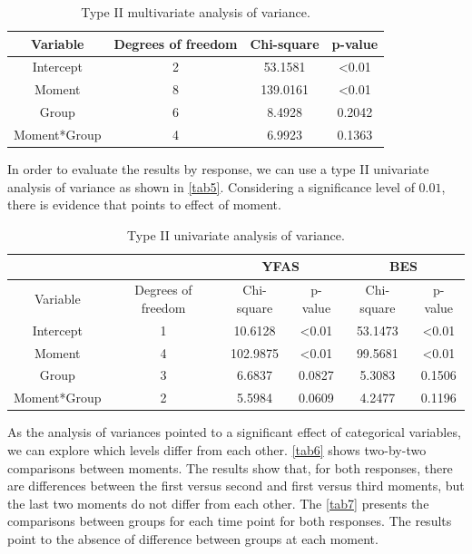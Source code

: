 \documentclass[USenglish]{article}
\theoremstyle{dgthm}
\theoremstyle{dgdef}
\begin{document}
\begin{table}[H]
\centering
\begin{tabular}{cccc}
\hline
Variable      & Degrees of freedom & Chi-square   & p-value        \\ \hline
Intercept     & 2                  & 53.1581      & \textless 0.01 \\
Moment        & 8                  & 139.0161     & \textless 0.01 \\
Group         & 6                  & 8.4928       & 0.2042         \\
Moment*Group  & 4                  & 6.9923       & 0.1363         \\ \hline
\end{tabular}
\caption{Type II multivariate analysis of variance.}
\label{tab4}
\end{table}

In order to evaluate the results by response, we can use a type II univariate analysis of variance as shown in \autoref{tab5}. Considering a significance level of $0.01$, there is evidence that points to effect of moment.

\begin{table}[H]
\centering
\begin{tabular}{c|c|cc|cc}
\hline
              &                    & \multicolumn{2}{c|}{YFAS}     & \multicolumn{2}{c}{BES}       \\ \hline
Variable      & Degrees of freedom & Chi-square   & p-value        & Chi-square   & p-value        \\ \hline
Intercept     & 1                  & 10.6128      & \textless 0.01 & 53.1473      & \textless 0.01 \\
Moment        & 4                  & 102.9875     & \textless 0.01 & 99.5681      & \textless 0.01 \\
Group         & 3                  & 6.6837       & 0.0827         & 5.3083       & 0.1506         \\
Moment*Group  & 2                  & 5.5984       & 0.0609         & 4.2477       & 0.1196         \\ \hline
\end{tabular}
\caption{Type II univariate analysis of variance.}
\label{tab5}
\end{table}

As the analysis of variances pointed to a significant effect of categorical variables, we can explore which levels differ from each other. \autoref{tab6} shows two-by-two comparisons between moments. The results show that, for both responses, there are differences between the first versus second and first versus third moments, but the last two moments do not differ from each other. The \autoref{tab7} presents the comparisons between groups for each time point for both responses. The results point to the absence of difference between groups at each moment.
\end{document}
